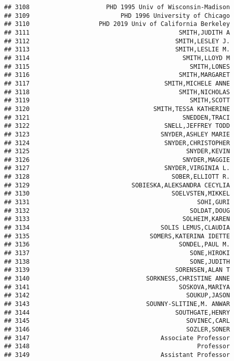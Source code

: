 \documentclass[
]{article}
\begin{document}
\begin{verbatim}
## 3108                     PHD 1995 Univ of Wisconsin-Madison
## 3109                         PHD 1996 University of Chicago
## 3110                   PHD 2019 Univ of California Berkeley
## 3111                                         SMITH,JUDITH A
## 3112                                        SMITH,LESLEY J.
## 3113                                        SMITH,LESLIE M.
## 3114                                          SMITH,LLOYD M
## 3115                                            SMITH,LONES
## 3116                                         SMITH,MARGARET
## 3117                                     SMITH,MICHELE ANNE
## 3118                                         SMITH,NICHOLAS
## 3119                                            SMITH,SCOTT
## 3120                                  SMITH,TESSA KATHERINE
## 3121                                          SNEDDEN,TRACI
## 3122                                     SNELL,JEFFREY TODD
## 3123                                    SNYDER,ASHLEY MARIE
## 3124                                     SNYDER,CHRISTOPHER
## 3125                                           SNYDER,KEVIN
## 3126                                          SNYDER,MAGGIE
## 3127                                     SNYDER,VIRGINIA L.
## 3128                                       SOBER,ELLIOTT R.
## 3129                            SOBIESKA,ALEKSANDRA CECYLIA
## 3130                                       SOELVSTEN,MIKKEL
## 3131                                              SOHI,GURI
## 3132                                            SOLDAT,DOUG
## 3133                                          SOLHEIM,KAREN
## 3134                                    SOLIS LEMUS,CLAUDIA
## 3135                                 SOMERS,KATERINA IDETTE
## 3136                                         SONDEL,PAUL M.
## 3137                                            SONE,HIROKI
## 3138                                            SONE,JUDITH
## 3139                                        SORENSEN,ALAN T
## 3140                                SORKNESS,CHRISTINE ANNE
## 3141                                         SOSKOVA,MARIYA
## 3142                                           SOUKUP,JASON
## 3143                                SOUNNY-SLITINE,M. ANWAR
## 3144                                        SOUTHGATE,HENRY
## 3145                                           SOVINEC,CARL
## 3146                                           SOZLER,SONER
## 3147                                    Associate Professor
## 3148                                              Professor
## 3149                                    Assistant Professor

\end{verbatim}
\end{document}
